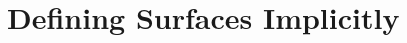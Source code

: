 \documentclass[acmlarge,nonacm=true]{acmart}
\begin{document}
\author{Pang Yu Shao}

\renewcommand{\shortauthors}{Pang Yu Shao}










\tableofcontents
\newpage
\section{Defining Surfaces Implicitly}
\end{document}
